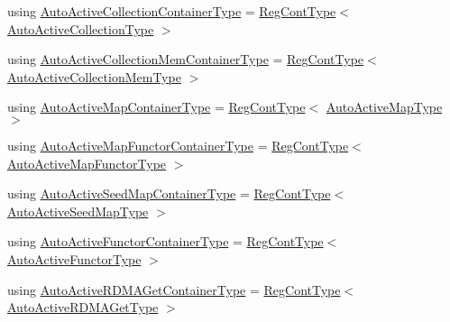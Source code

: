\begin{DoxyCompactItemize}
\item 
using \hyperlink{namespacevt_1_1auto__registry_a6d9b82aa23fd781ab64b6b4e55a4c94f}{Auto\+Active\+Collection\+Container\+Type} = \hyperlink{namespacevt_1_1auto__registry_a988a4943e4c8fe82b56f5b13bddceb2b}{Reg\+Cont\+Type}$<$ \hyperlink{namespacevt_1_1auto__registry_a3a45df4bb1c58e5178e3c0cf349baea4}{Auto\+Active\+Collection\+Type} $>$
\item 
using \hyperlink{namespacevt_1_1auto__registry_a2843152c64eb58ed89991d1d2ae2c3f1}{Auto\+Active\+Collection\+Mem\+Container\+Type} = \hyperlink{namespacevt_1_1auto__registry_a988a4943e4c8fe82b56f5b13bddceb2b}{Reg\+Cont\+Type}$<$ \hyperlink{namespacevt_1_1auto__registry_aa217123c03472f9bcee51300d638b16e}{Auto\+Active\+Collection\+Mem\+Type} $>$
\item 
using \hyperlink{namespacevt_1_1auto__registry_a9c5b8f15bca7b0ca4d56cae7c9f85d12}{Auto\+Active\+Map\+Container\+Type} = \hyperlink{namespacevt_1_1auto__registry_a988a4943e4c8fe82b56f5b13bddceb2b}{Reg\+Cont\+Type}$<$ \hyperlink{namespacevt_1_1auto__registry_a03898a246ff1a8ce8ee4071a0391b386}{Auto\+Active\+Map\+Type} $>$
\item 
using \hyperlink{namespacevt_1_1auto__registry_a531e799a0af154cbf069df74aec0f765}{Auto\+Active\+Map\+Functor\+Container\+Type} = \hyperlink{namespacevt_1_1auto__registry_a988a4943e4c8fe82b56f5b13bddceb2b}{Reg\+Cont\+Type}$<$ \hyperlink{namespacevt_1_1auto__registry_ab095554f67e143f84fe337bd85affde5}{Auto\+Active\+Map\+Functor\+Type} $>$
\item 
using \hyperlink{namespacevt_1_1auto__registry_ab66be9508a849981974eb0c5f9909ff4}{Auto\+Active\+Seed\+Map\+Container\+Type} = \hyperlink{namespacevt_1_1auto__registry_a988a4943e4c8fe82b56f5b13bddceb2b}{Reg\+Cont\+Type}$<$ \hyperlink{namespacevt_1_1auto__registry_a9b5f3bdf0a9a503806cfd4f2747c82f6}{Auto\+Active\+Seed\+Map\+Type} $>$
\item 
using \hyperlink{namespacevt_1_1auto__registry_abe0cefefe73cf87e520a5ab3ebc88f4a}{Auto\+Active\+Functor\+Container\+Type} = \hyperlink{namespacevt_1_1auto__registry_a988a4943e4c8fe82b56f5b13bddceb2b}{Reg\+Cont\+Type}$<$ \hyperlink{namespacevt_1_1auto__registry_a0efe8e4e502d6a88a8eb50d7d909228d}{Auto\+Active\+Functor\+Type} $>$
\item 
using \hyperlink{namespacevt_1_1auto__registry_a85bc3ac8c35caf2f304c24a73a07f1c6}{Auto\+Active\+R\+D\+M\+A\+Get\+Container\+Type} = \hyperlink{namespacevt_1_1auto__registry_a988a4943e4c8fe82b56f5b13bddceb2b}{Reg\+Cont\+Type}$<$ \hyperlink{namespacevt_1_1auto__registry_a039813f93a5804c77ae612e0318fb335}{Auto\+Active\+R\+D\+M\+A\+Get\+Type} $>$

\end{DoxyCompactItemize}
